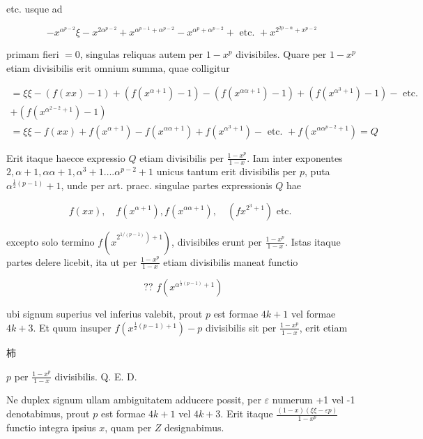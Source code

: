 \documentclass[10pt]{article}
\begin{document}
etc. usque ad

\[
-x^{\alpha^{p-2}} \xi-x^{2 \alpha^{p-2}}+x^{\alpha^{p-1}+\alpha^{p-2}}-x^{\alpha^{p}+\alpha^{p-2}}+\text { etc. }+x^{2^{2 p-\alpha}+x^{p-2}}
\]

primam fieri \(=0\), singulas reliquas autem per \(1-x^{p}\) divisibiles. Quare per \(1-x^{p}\) etiam divisibilis erit omnium summa, quae colligitur

\[
\begin{gathered}
=\xi \xi-(f(x x)-1)+\left(f\left(x^{\alpha+1}\right)-1\right)-\left(f\left(x^{\alpha \alpha+1}\right)-1\right)+\left(f\left(x^{\alpha^{3}+1}\right)-1\right)-\text { etc. } \\
+\left(f\left(x^{\alpha^{2-2}+1}\right)-1\right) \\
=\xi \xi-f(x x)+f\left(x^{\alpha+1}\right)-f\left(x^{\alpha \alpha+1}\right)+f\left(x^{\alpha^{3}+1}\right)-\text { etc. }+f\left(x^{\alpha \alpha^{p-2}+1}\right)=Q
\end{gathered}
\]

Erit itaque haecce expressio \(Q\) etiam divisibilis per \(\frac{1-x^{p}}{1-x}\). Iam inter exponentes \(2, \alpha+1, \alpha \alpha+1, \alpha^{3}+1 \ldots . \alpha^{p-2}+1\) unicus tantum erit divisibilis per \(p\), puta \(\alpha^{\frac{1}{2}(p-1)}+1\), unde per art. praec. singulae partes expressionis \(Q\) hae

\[
f(x x), \quad f\left(x^{\alpha+1}\right), f\left(x^{\alpha \alpha+1}\right), \quad\left(f x^{2^{3}+1}\right) \text { etc. }
\]

excepto solo termino \(f\left(x^{\left.2^{1 /(p-1)}\right)+1}\right)\), divisibiles erunt per \(\frac{1-x^{p}}{1-x}\). Istas itaque partes delere licebit, ita ut per \(\frac{1-x^{p}}{1-x}\) etiam divisibilis maneat functio

\[
\text { ?? } f\left(x^{\alpha^{\frac{1}{2}(p-1)}+1}\right)
\]

ubi signum superius vel inferius valebit, prout \(p\) est formae \(4 k+1\) vel formae \(4 k+3\). Et quum insuper \(f\left(x^{\frac{1}{2}(p-1)+1}\right)-p\) divisibilis sit per \(\frac{1-x^{p}}{1-x}\), erit etiam \begin{CJK}{UTF8}{mj}柿\end{CJK} \(p\) per \(\frac{1-x^{p}}{1-x}\) divisibilis. Q. E. D.

\(\mathrm{Ne}\) duplex signum ullam ambiguitatem adducere possit, per \(\varepsilon\) numerum +1 vel -1 denotabimus, prout \(p\) est formae \(4 k+1\) vel \(4 k+3\). Erit itaque \(\frac{(1-x)(\xi \xi-\varepsilon p)}{1-x^{p}}\) functio integra ipsius \(x\), quam per \(Z\) designabimus.
\end{document}
